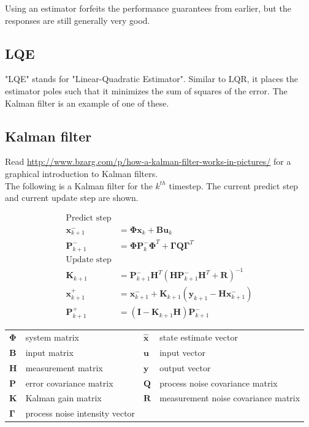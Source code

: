 \documentclass[10pt,conference,compsoc]{IEEEtran}
\newcommand{\mtx}[1] {\bm #1}
\begin{document}
Using an estimator forfeits the performance guarantees from earlier, but the
responses are still generally very good.

\subsection{LQE}

"LQE" stands for "Linear-Quadratic Estimator". Similar to LQR, it places the
estimator poles such that it minimizes the sum of squares of the error. The
Kalman filter is an example of one of these.

\subsection{Kalman filter}

Read \url{http://www.bzarg.com/p/how-a-kalman-filter-works-in-pictures/} for a
graphical introduction to Kalman filters. \\

The following is a Kalman filter for the $k^{th}$ timestep. The current predict
step and current update step are shown.

\begin{align}
  \text{Predict step} \nonumber \\
  \mtx{x}_{k+1}^- &= \mtx{\Phi} \mtx{x}_k + \mtx{B} \mtx{u}_k
    \label{eq:pre1_x} \\
  \mtx{P}_{k+1}^- &= \mtx{\Phi} \mtx{P}_k^- \mtx{\Phi}^T +
    \mtx{\Gamma}\mtx{Q}\mtx{\Gamma}^T \\
  \text{Update step} \nonumber \\
  \mtx{K}_{k+1} &= \mtx{P}_{k+1}^- \mtx{H}^T (\mtx{H}\mtx{P}_{k+1}^- \mtx{H}^T +
    \mtx{R})^{-1} \\
  \mtx{x}_{k+1}^+ &= \mtx{x}_{k+1}^- + \mtx{K}_{k+1} (\mtx{y}_{k+1} -
    \mtx{H} \mtx{x}_{k+1}^-) \label{eq:post1_x} \\
  \mtx{P}_{k+1}^+ &= (\mtx{I} - \mtx{K}_{k+1}\mtx{H})\mtx{P}_{k+1}^-
\end{align}

\begin{table}[ht]
  \renewcommand{\arraystretch}{1.3}
  \centering
  \begin{tabulary}{\linewidth}{LLLL}
    $\mtx{\Phi}$ & system matrix &
      $\hat{\mtx{x}}$ & state estimate vector \\
    $\mtx{B}$ & input matrix            & $\mtx{u}$ & input vector \\
    $\mtx{H}$ & measurement matrix      & $\mtx{y}$ & output vector \\
    $\mtx{P}$ & error covariance matrix &
      $\mtx{Q}$ & process noise covariance matrix \\
    $\mtx{K}$ & Kalman gain matrix &
      $\mtx{R}$ & measurement noise covariance matrix \\
    $\mtx{\Gamma}$ & process noise intensity vector &
  \end{tabulary}
  \label{tab:kalman_def}
\end{table}
\end{document}
